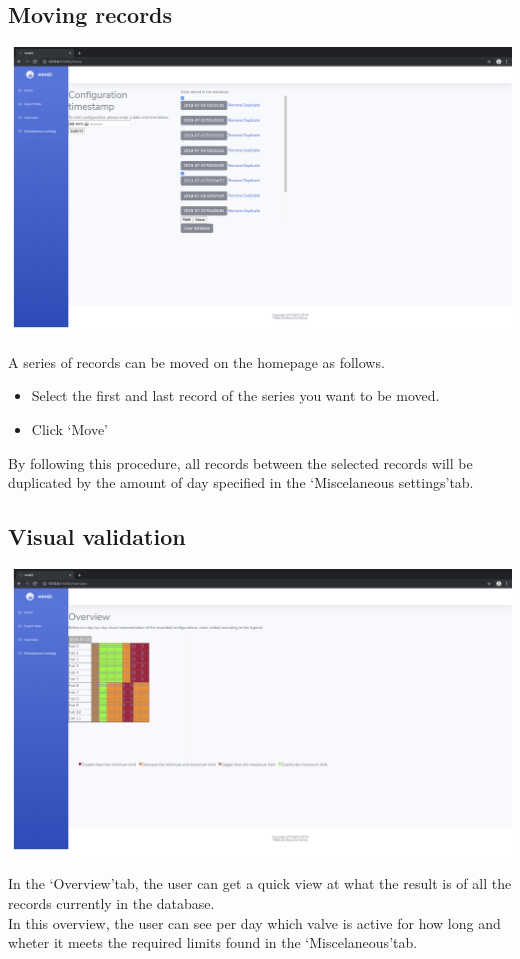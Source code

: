 \documentclass[12pt]{article}
\begin{document}
\subsection{Moving records}
\begin{center}
	\includegraphics[width=\linewidth]{images/Move_entries.png}
\end{center}
A series of records can be moved on the homepage as follows.
\begin{itemize}
	\item Select the first  and last record of the series you want to be moved.
	\item Click \lq Move\rq
\end{itemize}
By following this procedure, all records between the selected records will be duplicated by the amount of day specified in the \lq Miscelaneous settings\rq tab.

\subsection{Visual validation}
\begin{center}
	\includegraphics[width=\linewidth]{images/Overview.png}
\end{center}
In the \lq Overview\rq tab, the user can get a quick view at what the result is of all the records currently in the database.\\
In this overview, the user can see per day which valve is active for how long and wheter it meets the required limits found in the \lq Miscelaneous\rq tab.\\
\end{document}
